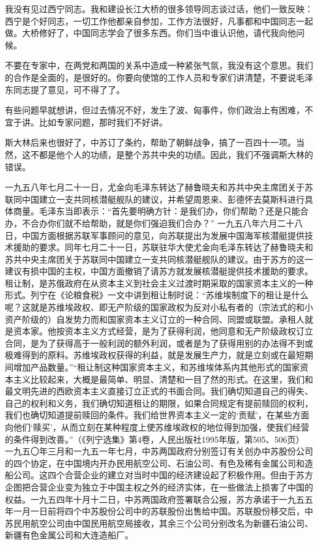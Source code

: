 我没有见过西宁同志。我和建设长江大桥的很多领导同志谈过话，他们一致反映：西宁是个好同志，一切工作他都亲自参加，工作方法很好，凡事都和中国同志一起做。大桥修好了，中国同志学会了很多东西。你们当中谁认识他，请代我向他问候。

不要在专家中，在两党和两国的关系中造成一种紧张气氛，我没有这个意思。我们的合作是全面的，是很好的。你要向使馆的工作人员和专家们讲清楚，不要说毛泽东同志提了意见，可不得了了。

有些问题早就想讲，但过去情况不好，发生了波、匈事件，你们政治上有困难，不宜于讲。比如专家问题，那时我们不好讲。

斯大林后来也很好了，中苏订了条约，帮助了朝鲜战争，搞了一百四十一项。当然，这不都是他个人的功绩，是整个苏共中央的功绩。因此，我们不强调斯大林的错误。

\begin{maonote}
一九五八年七月二十一日，尤金向毛泽东转达了赫鲁晓夫和苏共中央主席团关于苏联同中国建立一支共同核潜艇舰队的建议，并希望周恩来、彭德怀去莫斯科进行具体商量。毛泽东当即表示：“首先要明确方针：是我们办，你们帮助？还是只能合办，不合办你们就不给帮助，就是你们强迫我们合办？”
一九五八年六月二十八日，中国方面根据苏联军事顾问的意见，向苏联提出为发展中国海军核潜艇提供技术援助的要求。同年七月二十一日，苏联驻华大使尤金向毛泽东转达了赫鲁晓夫和苏共中央主席团关于苏联同中国建立一支共同核潜艇舰队的建议。由于苏方的这一建议有损中国的主权，中国方面撤销了请苏方就发展核潜艇提供技术援助的要求。
租让制，是苏俄政府在从资本主义到社会主义过渡时期采取的国家资本主义的一种形式。列宁在《论粮食税》一文中讲到租让制时说：“苏维埃制度下的租让是什么呢？这就是苏维埃政权、即无产阶级的国家政权为反对小私有者的（宗法式的和小资产阶级的）自发势力而和国家资本主义订立的一种合同、同盟或联盟。承租人就是资本家。他按资本主义方式经营，是为了获得利润，他同意和无产阶级政权订立合同，是为了获得高于一般利润的额外利润，或者是为了获得用别的办法得不到或极难得到的原料。苏维埃政权获得的利益，就是发展生产力，就是立刻或在最短期间增加产品数量。”“租让制这种国家资本主义，和苏维埃体系内其他形式的国家资本主义比较起来，大概是最简单、明显、清楚和一目了然的形式。在这里，我们和最文明先进的西欧资本主义直接订立正式的书面合同。我们确切知道自己的得失、自己的权利和义务，我们确切知道租让的期限，如果合同规定有提前赎回的权利，我们也确切知道提前赎回的条件。我们给世界资本主义一定的‘贡赋’，在某些方面向他们‘赎买’，从而立刻在某种程度上使苏维埃政权的地位得到加强，使我们经营的条件得到改善。”（《列宁选集》第4卷，人民出版社1995年版，第505、506页）
一九五〇年三月和一九五一年七月，中苏两国政府分别签订有关创办中苏股份公司的四个协定，在中国境内开办民用航空公司、石油公司、有色及稀有金属公司和造船公司。这四个合营企业的建立对当时中国的经济建设起了积极作用。但由于苏方企图把合营企业变为独立于中国主权之外的经济实体，在一些做法上损害了中国的权益。一九五四年十月十二日，中苏两国政府签署联合公报，苏方承诺于一九五五年一月一日前将四个中苏股份公司中的苏联股份出售给中国。苏联股份移交后，中苏民用航空公司由中国民用航空局接收，其余三个公司分别改名为新疆石油公司、新疆有色金属公司和大连造船厂。

\end{maonote}
